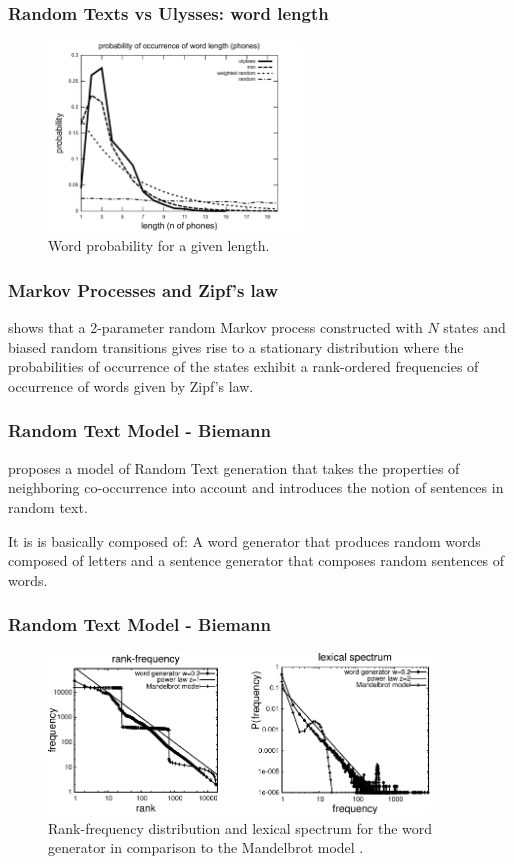 \documentclass[notes]{beamer}
\begin{document}
\frame
{
  \frametitle{Random Texts vs Ulysses: word length}
    \begin{figure}[h!]
    \centering
    \includegraphics[width=0.6\textwidth]{imagespresentation/ulysses_compared_word_length_probabilities.pdf}
    \caption{Word probability for a given length.}
    \label{fig:ulysses_compared_word_length_probabilities}
    \end{figure}
}



\frame
{
  \frametitle{Markov Processes and Zipf's law}
  \cite{kanter1995} shows that a 2-parameter random Markov process constructed with $N$ states and biased
  random transitions gives rise to a stationary distribution where the probabilities of occurrence of the
  states exhibit a rank-ordered frequencies of occurrence of words given by Zipf's law.
}


\frame
{
  \frametitle{Random Text Model - Biemann}
  \cite{biemann2007} proposes a model of Random Text generation that
  takes the properties of neighboring co-occurrence into account
  and introduces the notion of sentences in random text.
  
  It is is basically composed of: A word generator that produces random words 
  composed of letters and a sentence generator that composes random
  sentences of words.
}

\frame
{
  \frametitle{Random Text Model - Biemann}
    \begin{figure}[h!]
    \centering
    \includegraphics[width=0.9\textwidth]{imagespresentation/biemann.pdf}
    \caption{Rank-frequency distribution and lexical spectrum for the word generator in comparison to the Mandelbrot model \citep{biemann2007}.}
    \label{fig:biemann}
    \end{figure}
}
\end{document}
